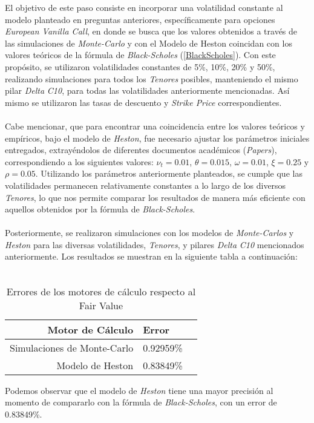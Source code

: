\noindent El objetivo de este paso consiste en incorporar una volatilidad constante al modelo planteado en preguntas anteriores, específicamente para opciones \textit{European Vanilla Call}, en donde se busca que los valores obtenidos a través de las simulaciones de \textit{Monte-Carlo} y con el Modelo de Heston coincidan con los valores teóricos de la fórmula de \textit{Black-Scholes} (\ref{BlackScholes}). Con este propósito, se utilizaron volatilidades constantes de 5\%, 10\%, 20\% y 50\%, realizando simulaciones para todos los \textit{Tenores} posibles, manteniendo el mismo pilar \textit{Delta} \textit{C10}, para todas las volatilidades anteriormente mencionadas. Así mismo se utilizaron las tasas de descuento y \textit{Strike Price} correspondientes.\\\\
\noindent Cabe mencionar, que para encontrar una coincidencia entre los valores teóricos y empíricos, bajo el modelo de \textit{Heston}, fue necesario ajustar los parámetros iniciales entregados, extrayéndolos de diferentes documentos académicos (\textit{Papers}), correspondiendo a los siguientes valores: $\nu_t=0.01$, $\theta=0.015$, $\omega=0.01$, $\xi=0.25$ y $\rho=0.05$. Utilizando los parámetros anteriormente planteados, se cumple que las volatilidades permanecen relativamente constantes a lo largo de los diversos \textit{Tenores}, lo que nos permite comparar los resultados de manera más eficiente con aquellos obtenidos por la fórmula de \textit{Black-Scholes}.\\\\

\noindent Posteriormente, se realizaron simulaciones con los modelos de  \textit{Monte-Carlos} y \textit{Heston} para las diversas volatilidades, \textit{Tenores}, y pilares \textit{Delta} \textit{C10} mencionados anteriormente. Los resultados se muestran en la siguiente tabla a continuación:\\\\

\begin{table}[h]
\begin{center}
\begin{tabular}{| r | l | c |}
\hline   
Motor de Cálculo & Error \\ \hline
Simulaciones de Monte-Carlo &  0.92959\% \\
Modelo de Heston &  0.83849\% \\ \hline
\end{tabular}
\caption{Errores de los motores de cálculo respecto al Fair Value}
\label{tab:fairValue}
\end{center}
\end{table}

\noindent Podemos observar que el modelo de \textit{Heston} tiene una mayor precisión al momento de compararlo con la fórmula de \textit{Black-Scholes}, con un error de 0.83849\%.
\newpage

